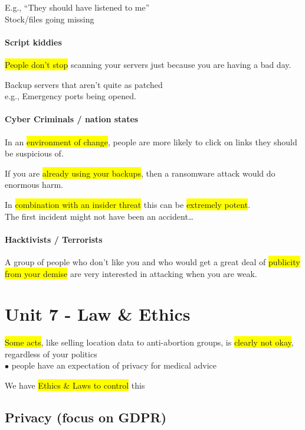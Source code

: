 \documentclass[tikz,border=10pt]{project_plan}
\newcommand{\bulletPoint}{\hspace{-3.1pt}$\bullet$ \hspace{5pt}}
\begin{document}
E.g.,
“They should have listened to me”\\
Stock/files going missing

\subsubsection{Script kiddies}

\colorbox{yellow}{People don’t stop} scanning your servers just because you are having a bad day.

Backup servers that aren’t quite as patched\\
e.g., Emergency ports being opened.

\subsubsection{Cyber Criminals / nation states}

In an \colorbox{yellow}{environment of change}, people are more likely to click on
links they should be suspicious of.

If you are \colorbox{yellow}{already using your backups}, then a ransomware
attack would do enormous harm.

In \colorbox{yellow}{combination with an insider threat} this can be \colorbox{yellow}{extremely potent}.\\
The first incident might not have been an accident…

\subsubsection{Hacktivists / Terrorists}

A group of people who don’t like you and who would get a great deal
of \colorbox{yellow}{publicity from your demise} are very interested in attacking when
you are weak.

\chapter{Unit 7 - Law \& Ethics}

\colorbox{yellow}{Some acts}, like selling location data to anti-abortion groups, is
\colorbox{yellow}{clearly not okay}, regardless of your politics\\
\bulletPoint people have an expectation of privacy for medical advice

We have \colorbox{yellow}{Ethics \& Laws to control} this

\section{Privacy (focus on GDPR)}
\end{document}
